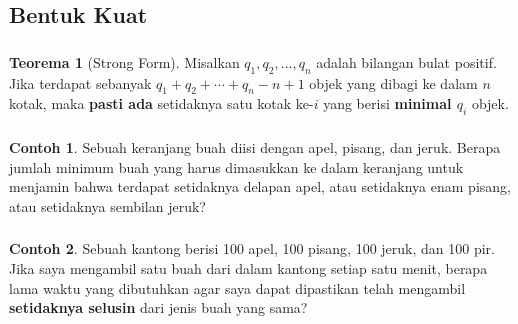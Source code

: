 \documentclass[aspectratio=169]{beamer}
\theoremstyle{definition}
\newtheorem{teorema}{Teorema}
\newtheorem{contoh}{Contoh}
\begin{document}
\subsection{Bentuk Kuat}
\begin{frame}
  \frametitle{\insertsection}
  \framesubtitle{\insertsubsection}
  \begin{teorema}[Strong Form]
    Misalkan \( q_1, q_2, \dots, q_n \) adalah bilangan bulat positif. Jika terdapat sebanyak \( q_1 + q_2 + \cdots + q_n - n + 1 \) objek yang dibagi ke dalam \( n \) kotak, maka \textbf{pasti ada} setidaknya satu kotak ke-\( i \) yang berisi \textbf{minimal \( q_i \)} objek.
  \end{teorema}
\end{frame}

\begin{frame}
  \frametitle{\insertsection}
  \framesubtitle{\insertsubsection}
  \begin{contoh}
    Sebuah keranjang buah diisi dengan apel, pisang, dan jeruk. Berapa jumlah minimum buah yang harus dimasukkan ke dalam keranjang untuk menjamin bahwa terdapat setidaknya delapan apel, atau setidaknya enam pisang, atau setidaknya sembilan jeruk?
  \end{contoh}
\end{frame}

\begin{frame}
  \frametitle{\insertsection}
  \framesubtitle{\insertsubsection}
  \begin{contoh}
    Sebuah kantong berisi 100 apel, 100 pisang, 100 jeruk, dan 100 pir. Jika saya mengambil satu buah dari dalam kantong setiap satu menit, berapa lama waktu yang dibutuhkan agar saya dapat dipastikan telah mengambil \textbf{setidaknya selusin} dari jenis buah yang sama?
  \end{contoh}
\end{frame}
\end{document}
